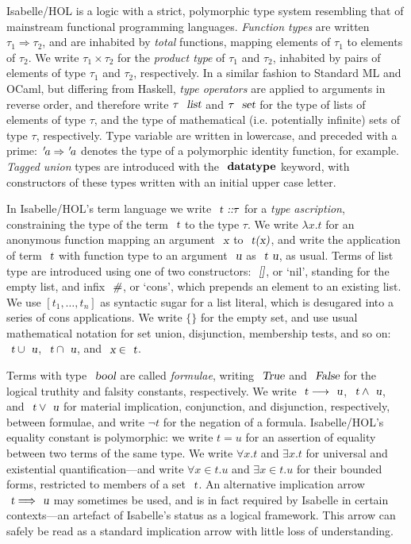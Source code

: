Isabelle/HOL is a logic with a strict, polymorphic type system resembling that of mainstream functional programming languages.
\emph{Function types} are written $\tau_1 \Rightarrow \tau_2$, and are inhabited by \emph{total} functions, mapping elements of $\tau_1$ to elements of $\tau_2$.
We write $\tau_1 \times \tau_2$ for the \emph{product type} of $\tau_1$ and $\tau_2$, inhabited by pairs of elements of type $\tau_1$ and $\tau_2$, respectively.
In a similar fashion to Standard ML and OCaml, but differing from Haskell, \emph{type operators} are applied to arguments in reverse order, and therefore write $\tau\ \isa{list}$ and $\tau\ \isa{set}$ for the type of lists of elements of type $\tau$, and the type of mathematical (i.e. potentially infinite) sets of type $\tau$, respectively.
Type variable are written in lowercase, and preceded with a prime: ${\emph{$\mskip2mu{'}\mskip-2mu$}}a \Rightarrow {\emph{$\mskip2mu{'}\mskip-2mu$}}a$ denotes the type of a polymorphic identity function, for example.
\emph{Tagged union} types are introduced with the $\isacommand{datatype}$ keyword, with constructors of these types written with an initial upper case letter.

In Isabelle/HOL's term language we write $\isa{t} \isa{::} \tau$ for a \emph{type ascription}, constraining the type of the term $\isa{t}$ to the type $\tau$.
We write $\lambda{x}. t$ for an anonymous function mapping an argument $\isa{x}$ to $\isa{t(x)}$, and write the application of term $\isa{t}$ with function type to an argument $\isa{u}$ as $\isa{t\ u}$, as usual.
Terms of list type are introduced using one of two constructors: $\isa{[]}$, or `nil', standing for the empty list, and infix $\isa{\#}$, or `cons', which prepends an element to an existing list.
We use $[t_1, \ldots, t_n]$ as syntactic sugar for a list literal, which is desugared into a series of cons applications.
We write $\{\}$ for the empty set, and use usual mathematical notation for set union, disjunction, membership tests, and so on: $\isa{t} \cup \isa{u}$, $\isa{t} \cap \isa{u}$, and $\isa{x} \in \isa{t}$.

Terms with type $\isa{bool}$ are called \emph{formulae}, writing $\isa{True}$ and $\isa{False}$ for the logical truthity and falsity constants, respectively.
We write $\isa{t} \longrightarrow \isa{u}$, $\isa{t} \wedge \isa{u}$, and $\isa{t} \vee \isa{u}$ for material implication, conjunction, and disjunction, respectively, between formulae, and write $\neg t$ for the negation of a formula.
Isabelle/HOL's equality constant is polymorphic: we write $t = u$ for an assertion of equality between two terms of the same type.
We write $\forall{x}.t$ and $\exists{x}.t$ for universal and existential quantification---and write $\forall{x{\in}t}.u$ and $\exists{x{\in}t}.u$ for their bounded forms, restricted to members of a set $\isa{t}$.
An alternative implication arrow $\isa{t} \Longrightarrow \isa{u}$ may sometimes be used, and is in fact required by Isabelle in certain contexts---an artefact of Isabelle's status as a logical framework.
This arrow can safely be read as a standard implication arrow with little loss of understanding.

